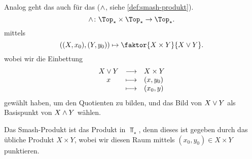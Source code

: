 \begin{example}
\begin{enumerate}[1)]
    Analog geht das auch für das  ($\wedge$, siehe \autoref{def:smash-produkt}).
    \[
    \tsmash\colon  \Top_{\star} \times \Top_{\star} \to  \Top_{\star}
    .\] 
    mittels
    \[
        ((X,x_0),(Y,y_0)) \mapsto \faktor{X \times Y}{X \twedge Y}
    .\] 
    wobei wir die Einbettung
        \begin{equation*}
        \begin{array}{c c l} 
        X \vee Y & \longrightarrow & X\times Y \\
        x & \longmapsto &  (x,y_0) \\
          & \longmapsto & (x_0,y)
        \end{array}
    \end{equation*}
    gewählt haben, um den Quotienten zu bilden, und das Bild von $X \vee Y$ als Basispunkt von  $X \wedge Y$ wählen.
\begin{oral}
    Das Smash-Produkt ist  das Produkt in $\Top_{\star}$, denn dieses ist gegeben durch das übliche Produkt $X \times  Y$, wobei wir diesen Raum mittels  $(x_0,y_0) \in  X \times Y$ punktieren.
\end{oral}
\begin{minipage}{\textwidth}
    \begin{minipage}{0.7\textwidth}
        

\end{minipage}
\end{minipage}
\end{enumerate}
\end{example}
